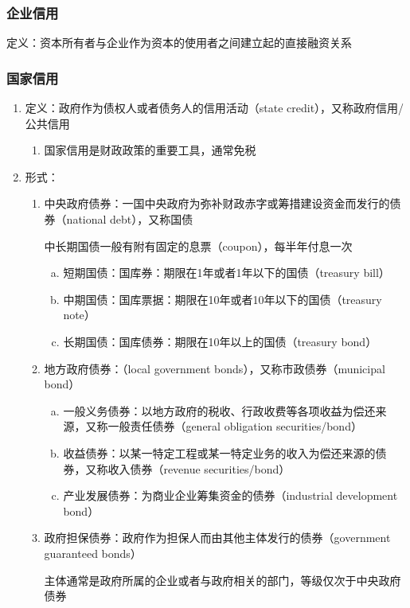 \documentclass[12pt]{book}
\begin{document}
\subsubsection{企业信用}

定义：资本所有者与企业作为资本的使用者之间建立起的直接融资关系

\subsubsection{国家信用}


\begin{enumerate}[1.]
    \item 定义：政府作为债权人或者债务人的信用活动（state credit），又称政府信用/公共信用
          \begin{enumerate}[(1)]
              \item 国家信用是财政政策的重要工具，通常免税
          \end{enumerate}
    \item 形式：
          \begin{enumerate}[(1)]
              \item 中央政府债券：一国中央政府为弥补财政赤字或筹措建设资金而发行的债券（national debt），又称国债
                    \par 中长期国债一般有附有固定的息票（coupon），每半年付息一次
                    \begin{enumerate}[a.]
                        \item 短期国债：国库券：期限在1年或者1年以下的国债（treasury bill）
                        \item 中期国债：国库票据：期限在10年或者10年以下的国债（treasury note）
                        \item 长期国债：国库债券：期限在10年以上的国债（treasury bond）
                    \end{enumerate}
              \item 地方政府债券：（local government bonds），又称市政债券（municipal bond）
                    \begin{enumerate}[a.]
                        \item 一般义务债券：以地方政府的税收、行政收费等各项收益为偿还来源，又称一般责任债券（general obligation securities/bond）
                        \item 收益债券：以某一特定工程或某一特定业务的收入为偿还来源的债券，又称收入债券（revenue securities/bond）
                        \item 产业发展债券：为商业企业筹集资金的债券（industrial development bond）
                    \end{enumerate}
              \item 政府担保债券：政府作为担保人而由其他主体发行的债券（government guaranteed bonds）
                    \par 主体通常是政府所属的企业或者与政府相关的部门，等级仅次于中央政府债券
          \end{enumerate}
\end{enumerate}
\end{document}

